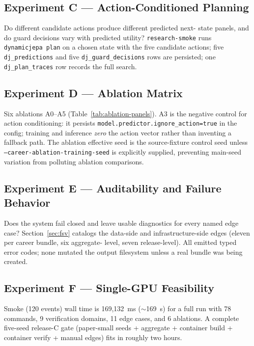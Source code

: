 \documentclass[10pt,twocolumn,letterpaper]{article}
\newcommand{\code}[1]{\texttt{\small #1}}
\begin{document}
\subsection{Experiment C --- Action-Conditioned Planning}

Do different candidate actions produce different predicted next-
state panels, and do guard decisions vary with predicted utility?
\code{research-smoke} runs \code{dynamicjepa plan} on a chosen
state with the five candidate actions; five \code{dj\_predictions}
and five \code{dj\_guard\_decisions} rows are persisted; one
\code{dj\_plan\_traces} row records the full search.

\subsection{Experiment D --- Ablation Matrix}

Six ablations A0--A5 (Table~\ref{tab:ablation-panels}). A3 is the
negative control for action conditioning: it persists
\code{model.predictor.ignore\_action=true} in the config; training
and inference \emph{zero} the action vector rather than inventing
a fallback path. The ablation effective seed is the source-fixture
control seed unless \code{--career-ablation-training-seed} is
explicitly supplied, preventing main-seed variation from polluting
ablation comparisons.

\subsection{Experiment E --- Auditability and Failure Behavior}

Does the system fail closed and leave usable diagnostics for every
named edge case? Section~\ref{sec:fsv} catalogs the data-side and
infrastructure-side edges (eleven per career bundle, six aggregate-
level, seven release-level). All emitted typed error codes; none
mutated the output filesystem unless a real bundle was being
created.

\subsection{Experiment F --- Single-GPU Feasibility}

Smoke (120 events) wall time is 169{,}132~ms ($\sim$169~s) for a
full run with 78 commands, 9 verification domains, 11 edge cases,
and 6 ablations. A complete five-seed release-C gate (paper-small
seeds + aggregate + container build + container verify + manual
edges) fits in roughly two hours.
\end{document}
